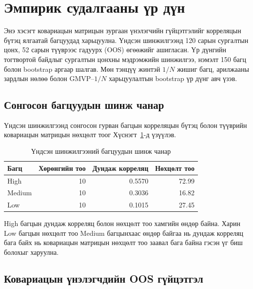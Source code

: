 \section{Эмпирик судалгааны үр дүн}
\label{sec:empirical_results}

Энэ хэсэгт ковариацын матрицын зургаан үнэлэгчийн
гүйцэтгэлийг корреляцын бүтэц ялгаатай багцуудад
харьцуулна. Үндсэн шинжилгээнд 120 сарын сургалтын
цонх, 52 сарын түүврээс гадуурх (OOS) өгөөжийг
ашигласан. Үр дүнгийн тогтвортой байдлыг сургалтын
цонхны мэдрэмжийн шинжилгээ, нэмэлт 150 багц болон
bootstrap аргаар шалгав. Мөн тэнцүү жинтэй $1/N$ жишиг багц,
арилжааны зардлын нөлөө болон GMVP--$1/N$
харьцуулалтын bootstrap үр дүнг авч үзэв.

\subsection{Сонгосон багцуудын шинж чанар}
\label{subsec:descriptive_statistics}

Үндсэн шинжилгээнд сонгосон гурван багцын
корреляцын бүтэц болон түүврийн ковариацын
матрицын нөхцөлт тоог
Хүснэгт~\ref{tab:portfolio_characteristics}-д
үзүүлэв.

\begin{table}[htbp]
	\centering
	\caption{Үндсэн шинжилгээний багцуудын шинж чанар}
	\label{tab:portfolio_characteristics}
	\small
	\begin{tabular}{lrrr}
		\hline
		Багц & Хөрөнгийн тоо &
		Дундаж корреляц & Нөхцөлт тоо\\
		\hline
		High   & 10 & 0.5570 & 72.99\\
		Medium & 10 & 0.3036 & 16.82\\
		Low    & 10 & 0.1015 & 27.45\\
		\hline
	\end{tabular}
\end{table}

High багцын дундаж корреляц болон нөхцөлт
тоо хамгийн өндөр байна. Харин Low багцын
нөхцөлт тоо Medium багцынхаас өндөр байгаа
нь дундаж корреляц бага байх нь ковариацын
матрицын нөхцөлт тоо заавал бага байна
гэсэн үг биш болохыг харуулна.

\subsection{Ковариацын үнэлэгчдийн OOS гүйцэтгэл}
\label{subsec:oos_performance}

